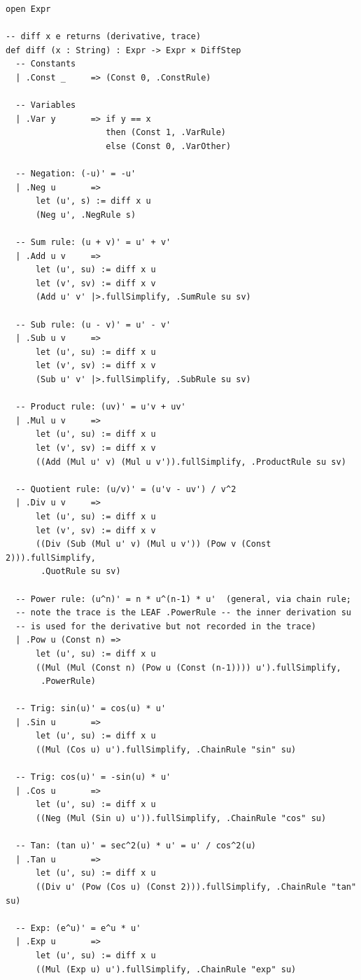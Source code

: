 \documentclass[12pt, openany]{book}
\theoremstyle{plain}
\theoremstyle{definition}
\theoremstyle{remark}
\begin{document}
\begin{leanbox}
\begin{lstlisting}
open Expr

-- diff x e returns (derivative, trace)
def diff (x : String) : Expr -> Expr × DiffStep
  -- Constants
  | .Const _     => (Const 0, .ConstRule)

  -- Variables
  | .Var y       => if y == x
                    then (Const 1, .VarRule)
                    else (Const 0, .VarOther)

  -- Negation: (-u)' = -u'
  | .Neg u       =>
      let (u', s) := diff x u
      (Neg u', .NegRule s)

  -- Sum rule: (u + v)' = u' + v'
  | .Add u v     =>
      let (u', su) := diff x u
      let (v', sv) := diff x v
      (Add u' v' |>.fullSimplify, .SumRule su sv)

  -- Sub rule: (u - v)' = u' - v'
  | .Sub u v     =>
      let (u', su) := diff x u
      let (v', sv) := diff x v
      (Sub u' v' |>.fullSimplify, .SubRule su sv)

  -- Product rule: (uv)' = u'v + uv'
  | .Mul u v     =>
      let (u', su) := diff x u
      let (v', sv) := diff x v
      ((Add (Mul u' v) (Mul u v')).fullSimplify, .ProductRule su sv)

  -- Quotient rule: (u/v)' = (u'v - uv') / v^2
  | .Div u v     =>
      let (u', su) := diff x u
      let (v', sv) := diff x v
      ((Div (Sub (Mul u' v) (Mul u v')) (Pow v (Const 2))).fullSimplify,
       .QuotRule su sv)

  -- Power rule: (u^n)' = n * u^(n-1) * u'  (general, via chain rule;
  -- note the trace is the LEAF .PowerRule -- the inner derivation su
  -- is used for the derivative but not recorded in the trace)
  | .Pow u (Const n) =>
      let (u', su) := diff x u
      ((Mul (Mul (Const n) (Pow u (Const (n-1)))) u').fullSimplify,
       .PowerRule)

  -- Trig: sin(u)' = cos(u) * u'
  | .Sin u       =>
      let (u', su) := diff x u
      ((Mul (Cos u) u').fullSimplify, .ChainRule "sin" su)

  -- Trig: cos(u)' = -sin(u) * u'
  | .Cos u       =>
      let (u', su) := diff x u
      ((Neg (Mul (Sin u) u')).fullSimplify, .ChainRule "cos" su)

  -- Tan: (tan u)' = sec^2(u) * u' = u' / cos^2(u)
  | .Tan u       =>
      let (u', su) := diff x u
      ((Div u' (Pow (Cos u) (Const 2))).fullSimplify, .ChainRule "tan" su)

  -- Exp: (e^u)' = e^u * u'
  | .Exp u       =>
      let (u', su) := diff x u
      ((Mul (Exp u) u').fullSimplify, .ChainRule "exp" su)


\end{lstlisting}
\end{leanbox}
\end{document}
